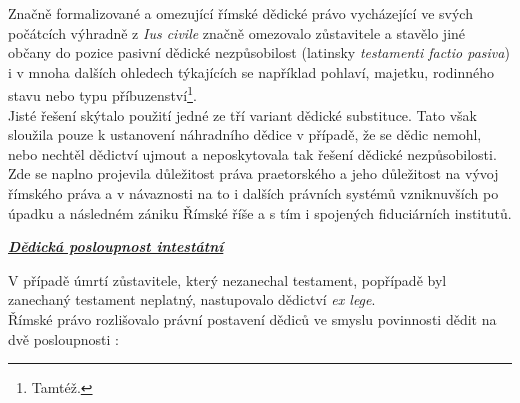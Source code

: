 \documentclass{article}
\begin{document}
Značně formalizované a omezující římské dědické právo vycházející ve svých počátcích výhradně z \textit{Ius civile} značně omezovalo zůstavitele a stavělo jiné občany do pozice pasivní dědické nezpůsobilost (latinsky \textit{testamenti factio pasiva}) i v mnoha dalších ohledech týkajících se například pohlaví, majetku, rodinného stavu nebo typu příbuzenství\footnote{Tamtéž.}.\\

Jisté řešení skýtalo použití jedné ze tří variant dědické substituce. Tato však sloužila pouze k ustanovení náhradního dědice v případě, že se dědic nemohl, nebo nechtěl dědictví ujmout a neposkytovala tak řešení dědické nezpůsobilosti.\\

Zde se naplno projevila důležitost práva praetorského a jeho důležitost na vývoj římského práva a v návaznosti na to i dalších právních systémů vzniknuv\-ších po úpadku a následném zániku Římské říše a s tím i spojených fiduciárních institutů.\\

\newpage

\underline{\textbf{\textit{Dědická posloupnost intestátní}}}

\vspace*{5 mm}

V případě úmrtí zůstavitele, který nezanechal testament, popřípadě byl zanechaný testament neplatný, nastupovalo dědictví \textit{ex lege}.\\


Římské právo rozlišovalo právní postavení dědiců ve smyslu povinnosti dědit na dvě posloupnosti :

\vspace{5 mm}

\end{document}
